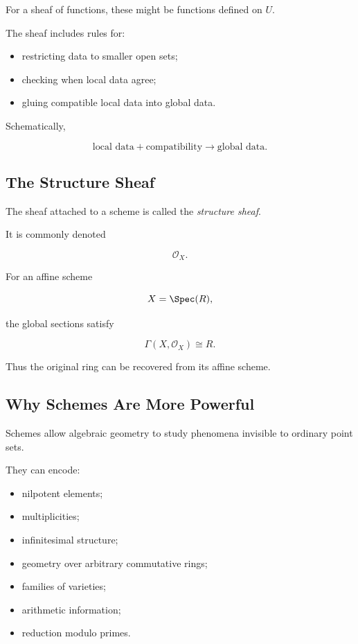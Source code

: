 For a sheaf of functions, these might be functions defined on \(U\).

The sheaf includes rules for:

\begin{itemize}
    \item restricting data to smaller open sets;
    \item checking when local data agree;
    \item gluing compatible local data into global data.
\end{itemize}

Schematically,

\[
\boxed{
\text{local data}
+
\text{compatibility}
\longrightarrow
\text{global data}.
}
\]

\subsection{The Structure Sheaf}
\label{subsec:structure-sheaf}

The sheaf attached to a scheme is called the \emph{structure sheaf}.

It is commonly denoted

\[
\boxed{
\mathcal{O}_X.
}
\]

For an affine scheme

\[
X=\Spec(R),
\]

the global sections satisfy

\[
\boxed{
\Gamma(X,\mathcal{O}_X)\cong R.
}
\]

Thus the original ring can be recovered from its affine scheme.

\subsection{Why Schemes Are More Powerful}
\label{subsec:why-schemes}

Schemes allow algebraic geometry to study phenomena invisible to ordinary
point sets.

They can encode:

\begin{itemize}
    \item nilpotent elements;
    \item multiplicities;
    \item infinitesimal structure;
    \item geometry over arbitrary commutative rings;
    \item families of varieties;
    \item arithmetic information;
    \item reduction modulo primes.
\end{itemize}

